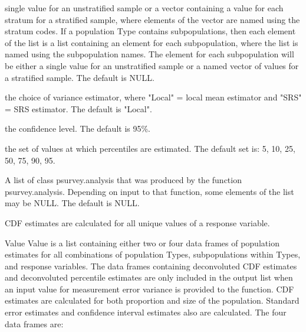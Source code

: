 \begin{Arguments}
\begin{ldescription}
single value for an unstratified sample or a vector containing a value  
for each stratum for a stratified sample, where elements of the vector
are named using the stratum codes.  If a population Type contains 
subpopulations, then each element of the list is a list containing an 
element for each subpopulation, where the list is named using the 
subpopulation names.  The element for each subpopulation will be 
either a single value for an unstratified sample or a named vector of 
values for a stratified sample.  The default is NULL.
\item[\code{vartype}] the choice of variance estimator, where "Local" = local mean
estimator and "SRS" = SRS estimator.  The default is "Local".
\item[\code{conf}] the confidence level.  The default is 95\%.
\item[\code{pctval}] the set of values at which percentiles are estimated.  The
default set is: {5, 10, 25, 50, 75, 90, 95}.
\item[\code{psurvey.obj}] A list of class psurvey.analysis that was produced by the
function psurvey.analysis.  Depending on input to that function,
some elements of the list may be NULL.  The default is NULL.
\end{ldescription}
\end{Arguments}
\begin{Details}\relax
CDF estimates are calculated for all unique values of a response variable.
\end{Details}
\begin{Section}{Value}
Value is a list containing either two or four data frames of population estimates
for all combinations of population Types, subpopulations within Types, and
response variables.  The data frames containing deconvoluted CDF estimates and
deconvoluted percentile estimates are only included in the output list when an
input value for measurement error variance is provided to the function.  CDF
estimates are calculated for both proportion and size of the population.
Standard error estimates and confidence interval estimates also  are
calculated.  The four data frames are:
\end{Section}
